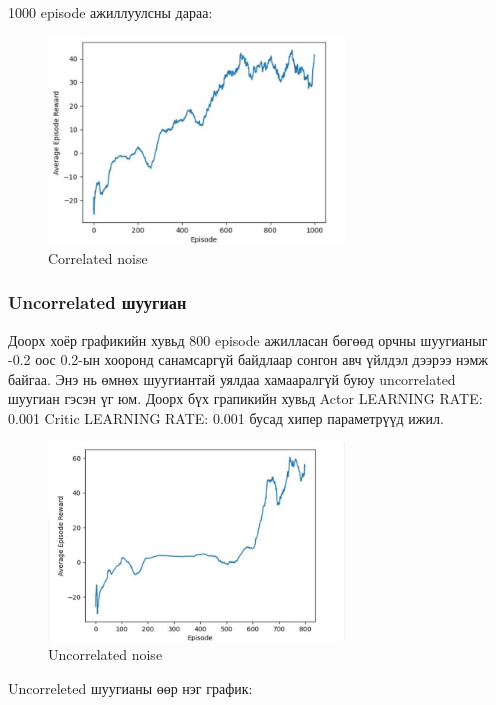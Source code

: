 \documentclass[12pt,A4]{report}
\begin{document}
1000 episode ажиллуулсны дараа:

\begin{figure}[H]
\centering
\includegraphics[width=0.7\textwidth]{./images/after_1000_ep2}
\caption{Correlated noise}
\end{figure}

\subsubsection{Uncorrelated шуугиан}

Доорх хоёр графикийн хувьд 800 episode ажилласан бөгөөд орчны шуугианыг -0.2 оос 0.2-ын хооронд санамсаргүй байдлаар сонгон авч үйлдэл дээрээ нэмж байгаа. Энэ нь өмнөх шуугиантай уялдаа хамааралгүй буюу uncorrelated шуугиан гэсэн үг юм. Доорх бүх грапикийн хувьд Actor LEARNING RATE: 0.001 Critic LEARNING RATE: 0.001 бусад хипер параметрүүд ижил. 

\begin{figure}[H]
\centering
\includegraphics[width=0.7\textwidth]{./images/after_800_ep_02}
\caption{Uncorrelated noise}
\end{figure}

Uncorreleted шуугианы өөр нэг график:
\end{document}
